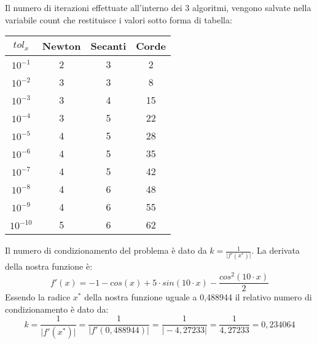 \begin{flushleft}

Il numero di iterazioni effettuate all'interno dei 3 algoritmi, vengono salvate nella variabile count che restituisce i valori sotto forma di tabella:

\begin{center}
\begin{tabular}{|c|c|c|c|}
\hline
$tol_x$ & Newton & Secanti & Corde \\
\hline
$10^{-1}$ & 2 & 3 & 2 \\
$10^{-2}$ & 3 & 3 & 8 \\
$10^{-3}$ & 3 & 4 & 15 \\
$10^{-4}$ & 3 & 5 & 22 \\
$10^{-5}$ & 4 & 5 & 28 \\
$10^{-6}$ & 4 & 5 & 35 \\
$10^{-7}$ & 4 & 5 & 42 \\
$10^{-8}$ & 4 & 6 & 48 \\
$10^{-9}$ & 4 & 6 & 55 \\
$10^{-10}$ & 5 & 6 & 62 \\
\hline
\end{tabular}
\end{center}

Il numero di condizionamento del problema è dato da $k = \frac{1}{\big|f'(x^*)\big|}$. La derivata della nostra funzione è:
\[
f'(x) = -1 - cos(x) + 5 \cdot sin(10\cdot x) - \frac{cos^2(10\cdot x)}{2}
\]
Essendo la radice $x^*$ della nostra funzione uguale a 0,488944 il relativo numero di condizionamento è dato da:
\[
k = \frac{1}{\Big|f'(x^*)\Big|} = \frac{1}{\Big|f'(0,488944)\Big|} = \frac{1}{\Big|-4,27233\Big|} = \frac{1}{4,27233} = 0,234064
\]
\end{flushleft}